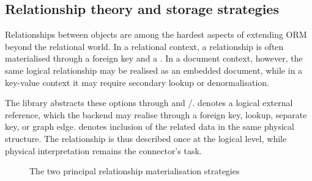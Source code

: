 \subsection{Relationship theory and storage strategies}

Relationships between objects are among the hardest aspects of extending ORM beyond the relational world. In a relational context, a relationship is often materialised through a foreign key and a . In a document context, however, the same logical relationship may be realised as an embedded document, while in a key-value context it may require secondary lookup or denormalisation.

The library abstracts these options through  and /.  denotes a logical external reference, which the backend may realise through a foreign key, lookup, separate key, or graph edge.  denotes inclusion of the related data in the same physical structure. The relationship is thus described once at the logical level, while physical interpretation remains the connector's task.

\begin{figure}[H]
\centering
{}
\caption{The two principal relationship materialisation strategies}
\label{fig:relationship_strategies}
\end{figure}


